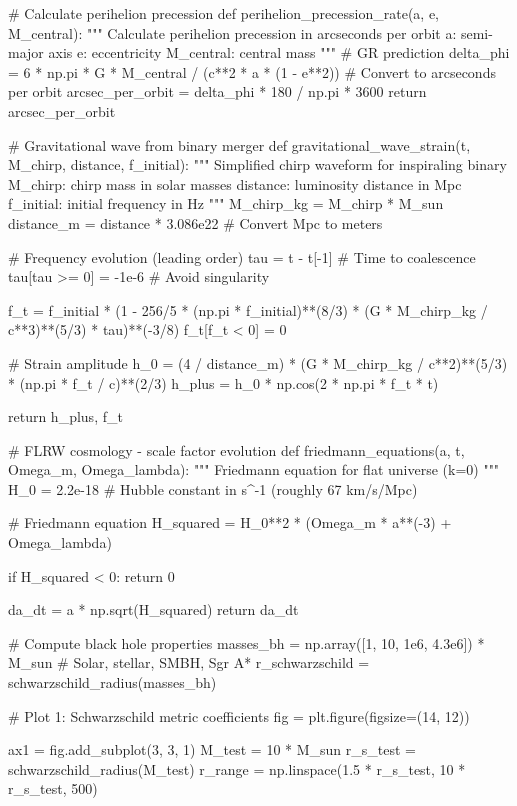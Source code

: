 \documentclass[a4paper, 11pt]{article}
\begin{document}
\begin{pycode}
# Calculate perihelion precession
def perihelion_precession_rate(a, e, M_central):
    """
    Calculate perihelion precession in arcseconds per orbit
    a: semi-major axis
    e: eccentricity
    M_central: central mass
    """
    # GR prediction
    delta_phi = 6 * np.pi * G * M_central / (c**2 * a * (1 - e**2))
    # Convert to arcseconds per orbit
    arcsec_per_orbit = delta_phi * 180 / np.pi * 3600
    return arcsec_per_orbit

# Gravitational wave from binary merger
def gravitational_wave_strain(t, M_chirp, distance, f_initial):
    """
    Simplified chirp waveform for inspiraling binary
    M_chirp: chirp mass in solar masses
    distance: luminosity distance in Mpc
    f_initial: initial frequency in Hz
    """
    M_chirp_kg = M_chirp * M_sun
    distance_m = distance * 3.086e22  # Convert Mpc to meters

    # Frequency evolution (leading order)
    tau = t - t[-1]  # Time to coalescence
    tau[tau >= 0] = -1e-6  # Avoid singularity

    f_t = f_initial * (1 - 256/5 * (np.pi * f_initial)**(8/3) *
                       (G * M_chirp_kg / c**3)**(5/3) * tau)**(-3/8)
    f_t[f_t < 0] = 0

    # Strain amplitude
    h_0 = (4 / distance_m) * (G * M_chirp_kg / c**2)**(5/3) * (np.pi * f_t / c)**(2/3)
    h_plus = h_0 * np.cos(2 * np.pi * f_t * t)

    return h_plus, f_t

# FLRW cosmology - scale factor evolution
def friedmann_equations(a, t, Omega_m, Omega_lambda):
    """
    Friedmann equation for flat universe (k=0)
    """
    H_0 = 2.2e-18  # Hubble constant in s^-1 (roughly 67 km/s/Mpc)

    # Friedmann equation
    H_squared = H_0**2 * (Omega_m * a**(-3) + Omega_lambda)

    if H_squared < 0:
        return 0

    da_dt = a * np.sqrt(H_squared)
    return da_dt

# Compute black hole properties
masses_bh = np.array([1, 10, 1e6, 4.3e6]) * M_sun  # Solar, stellar, SMBH, Sgr A*
r_schwarzschild = schwarzschild_radius(masses_bh)

# Plot 1: Schwarzschild metric coefficients
fig = plt.figure(figsize=(14, 12))

ax1 = fig.add_subplot(3, 3, 1)
M_test = 10 * M_sun
r_s_test = schwarzschild_radius(M_test)
r_range = np.linspace(1.5 * r_s_test, 10 * r_s_test, 500)


\end{pycode}
\end{document}
